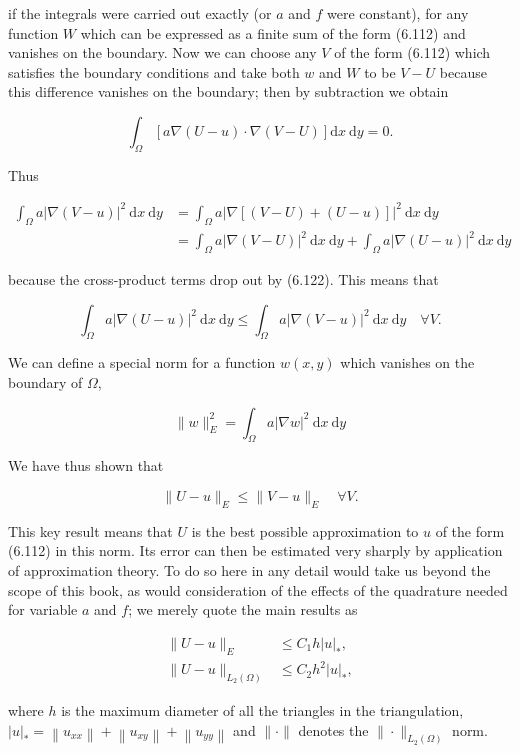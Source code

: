 \documentclass[10pt]{article}
\begin{document}
if the integrals were carried out exactly (or \(a\) and \(f\) were constant), for any function \(W\) which can be expressed as a finite sum of the form (6.112) and vanishes on the boundary. Now we can choose any \(V\) of the form (6.112) which satisfies the boundary conditions and take both \(w\) and \(W\) to be \(V-U\) because this difference vanishes on the boundary; then by subtraction we obtain

\[
\int_{\Omega}[a \nabla(U-u) \cdot \nabla(V-U)] \mathrm{d} x \mathrm{~d} y=0 .
\]

Thus

\[
\begin{aligned}
\int_{\Omega} a|\nabla(V-u)|^{2} \mathrm{~d} x \mathrm{~d} y & =\int_{\Omega} a|\nabla[(V-U)+(U-u)]|^{2} \mathrm{~d} x \mathrm{~d} y \\
& =\int_{\Omega} a|\nabla(V-U)|^{2} \mathrm{~d} x \mathrm{~d} y+\int_{\Omega} a|\nabla(U-u)|^{2} \mathrm{~d} x \mathrm{~d} y
\end{aligned}
\]

because the cross-product terms drop out by (6.122). This means that

\[
\int_{\Omega} a|\nabla(U-u)|^{2} \mathrm{~d} x \mathrm{~d} y \leq \int_{\Omega} a|\nabla(V-u)|^{2} \mathrm{~d} x \mathrm{~d} y \quad \forall V .
\]

We can define a special norm for a function \(w(x, y)\) which vanishes on the boundary of \(\Omega\),

\[
\|w\|_{E}^{2}=\int_{\Omega} a|\nabla w|^{2} \mathrm{~d} x \mathrm{~d} y
\]

We have thus shown that

\[
\|U-u\|_{E} \leq\|V-u\|_{E} \quad \forall V .
\]

This key result means that \(U\) is the best possible approximation to \(u\) of the form (6.112) in this norm. Its error can then be estimated very sharply by application of approximation theory. To do so here in any detail would take us beyond the scope of this book, as would consideration of the effects of the quadrature needed for variable \(a\) and \(f\); we merely quote the main results as

\[
\begin{aligned}
\|U-u\|_{E} & \leq C_{1} h|u|_{*}, \\
\|U-u\|_{L_{2}(\Omega)} & \leq C_{2} h^{2}|u|_{*},
\end{aligned}
\]

where \(h\) is the maximum diameter of all the triangles in the triangulation, \(|u|_{*}=\left\|u_{x x}\right\|+\left\|u_{x y}\right\|+\left\|u_{y y}\right\|\) and \(\|\cdot\|\) denotes the \(\|\cdot\|_{L_{2}(\Omega)}\) norm.
\end{document}
